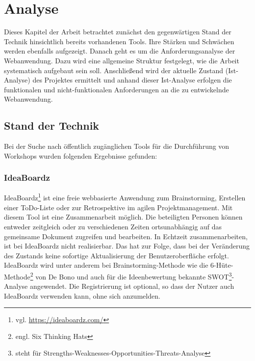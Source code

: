 \chapter{Analyse}
\label{sec:analyse}
Dieses Kapitel der Arbeit betrachtet zunächst den gegenwärtigen Stand der Technik hinsichtlich bereits vorhandenen Tools. Ihre Stärken und Schwächen werden ebenfalls aufgezeigt. Danach geht es um die Anforderungsanalyse der Webanwendung. Dazu wird eine allgemeine Struktur festgelegt, wie die Arbeit systematisch aufgebaut sein soll. Anschließend wird der aktuelle Zustand (Ist-Analyse) des Projektes ermittelt und anhand dieser Ist-Analyse erfolgen die funktionalen und nicht-funktionalen Anforderungen an die zu entwickelnde Webanwendung.

\section{Stand der Technik}
\label{sec:stand der technik}
Bei der Suche nach öffentlich zugänglichen Tools für die Durchführung von Workshops wurden folgenden Ergebnisse gefunden:

\subsection{IdeaBoardz}
\label{sec:ideaBoardz}
IdeaBoardz\footnote{vgl. \url{https://ideaboardz.com/}} ist eine freie webbasierte Anwendung zum Brainstorming, Erstellen einer ToDo-Liste oder zur Retrospektive im agilen Projektmanagement. Mit diesem Tool ist eine Zusammenarbeit möglich. Die beteiligten Personen können entweder zeitgleich oder zu verschiedenen Zeiten ortsunabhängig auf das gemeinsame Dokument zugreifen und bearbeiten. In Echtzeit zusammenarbeiten, ist bei IdeaBoardz nicht realisierbar. Das hat zur Folge, dass bei der Veränderung des Zustands keine sofortige Aktualisierung der Benutzeroberfläche erfolgt. IdeaBoardz wird unter anderem bei Brainstorming-Methode wie die 6-Hüte-Methode\footnote{engl. Six Thinking Hats} von De Bono und auch für die Ideenbewertung bekannte SWOT\footnote{steht für Strengths-Weaknesses-Opportunities-Threats-Analyse}-Analyse angewendet. Die Registrierung ist optional, so dass der Nutzer auch IdeaBoardz verwenden kann, ohne sich anzumelden.

